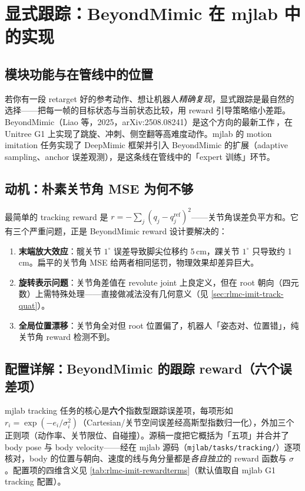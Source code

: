 \section{显式跟踪：BeyondMimic 在 mjlab 中的实现}
\label{sec:rlmc-imit-track}

\subsection{模块功能与在管线中的位置}
\label{sec:rlmc-imit-track-pos}

若你有一段 retarget 好的参考动作、想让机器人\emph{精确复现}，显式跟踪是最自然的选择——把每一帧的目标状态与当前状态比较，用 reward 引导策略缩小差距。BeyondMimic（Liao 等，2025，arXiv:2508.08241）是这个方向的最新工作\,\cite{liao2025beyondmimic}，在 Unitree G1 上实现了跳旋、冲刺、侧空翻等高难度动作。mjlab 的 motion imitation 任务实现了 DeepMimic 框架并引入 BeyondMimic 的扩展（adaptive sampling、anchor 误差观测），是这条线在管线中的「expert 训练」环节。

\subsection{动机：朴素关节角 MSE 为何不够}
\label{sec:rlmc-imit-track-naive}

最简单的 tracking reward 是 $r=-\sum_j (q_j-q_j^{\text{ref}})^2$——关节角误差负平方和。它有三个严重问题，正是 BeyondMimic reward 设计要解决的：

\begin{enumerate}
  \item \textbf{末端放大效应}：髋关节 $1^\circ$ 误差导致脚尖位移约 5\,cm，踝关节 $1^\circ$ 只导致约 1\,cm。扁平的关节角 MSE 给两者相同惩罚，物理效果却差异巨大。
  \item \textbf{旋转表示问题}：关节角差值在 revolute joint 上良定义，但在 root 朝向（四元数）上需特殊处理——直接做减法没有几何意义（见 \cref{sec:rlmc-imit-track-quat}）。
  \item \textbf{全局位置漂移}：关节角全对但 root 位置偏了，机器人「姿态对、位置错」，纯关节角 reward 检测不到。
\end{enumerate}

\subsection{配置详解：BeyondMimic 的跟踪 reward（六个误差项）}
\label{sec:rlmc-imit-track-reward}

mjlab tracking 任务的核心是\textbf{六个}指数型跟踪误差项，每项形如 $r_i=\exp(-e_i/\sigma_i^2)$（Cartesian/关节空间误差经高斯型指数归一化），外加三个正则项（动作率、关节限位、自碰撞）。源稿一度把它概括为「五项」并合并了 body pose 与 body velocity——经在 mjlab 源码（\texttt{mjlab/\allowbreak tasks/\allowbreak tracking/\allowbreak }）逐项核对，body 的位置与朝向、速度的线与角分量都是\emph{各自独立}的 reward 函数与 $\sigma$。配置项的四维含义见 \cref{tab:rlmc-imit-rewardterms}（默认值取自 mjlab G1 tracking 配置）。

